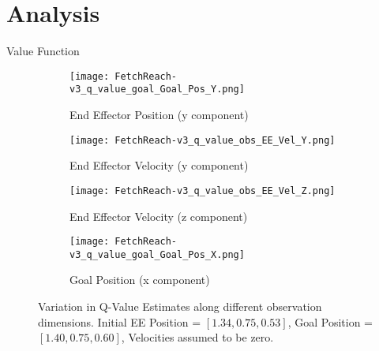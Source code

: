 \section{Analysis}

\begin{frame}{Value Function}
    \begin{figure}
        \centering
        \begin{subfigure}{0.33\textwidth}
            \centering
            \texttt{[image: FetchReach-v3\_q\_value\_goal\_Goal\_Pos\_Y.png]}
            \caption{End Effector Position (y component)}
        \end{subfigure}
        \begin{subfigure}{0.33\textwidth}
            \centering
            \texttt{[image: FetchReach-v3\_q\_value\_obs\_EE\_Vel\_Y.png]}
            \caption{End Effector Velocity (y component)}
        \end{subfigure}
        \begin{subfigure}{0.33\textwidth}
            \centering
            \texttt{[image: FetchReach-v3\_q\_value\_obs\_EE\_Vel\_Z.png]}
            \caption{End Effector Velocity (z component)}
        \end{subfigure}
        \begin{subfigure}{0.33\textwidth}
            \centering
            \texttt{[image: FetchReach-v3\_q\_value\_goal\_Goal\_Pos\_X.png]}
            \caption{Goal Position (x component)}
        \end{subfigure}
        \caption{Variation in Q-Value Estimates along different observation dimensions. Initial EE Position = $[1.34, 0.75, 0.53]$, Goal Position = $[1.40, 0.75, 0.60]$, Velocities assumed to be zero.}
    \end{figure}
\end{frame}

